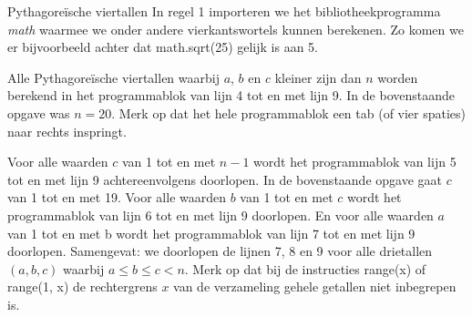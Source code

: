 \begin{lesactiviteit}{Pythagoreïsche viertallen}
    In regel 1 importeren we het bibliotheekprogramma \emph{math} waarmee we onder andere  vierkantswortels kunnen berekenen. Zo komen we er bijvoorbeeld achter dat math.sqrt(25) gelijk is aan 5.
    
    Alle Pythagoreïsche viertallen waarbij $a$, $b$ en $c$ kleiner zijn dan $n$ worden berekend in het programmablok van lijn 4 tot en met lijn 9. In de bovenstaande opgave was $n=20$. Merk op dat het hele programmablok een tab (of vier spaties) naar rechts inspringt.
    
    Voor alle waarden $c$ van 1 tot en met $n-1$ wordt het programmablok van lijn 5 tot en met lijn 9 achtereenvolgens doorlopen. In de bovenstaande opgave gaat $c$ van 1 tot en met 19. Voor alle waarden $b$ van 1 tot en met $c$ wordt het programmablok van lijn 6 tot en met lijn 9 doorlopen. En voor alle waarden $a$ van 1 tot en met b wordt het programmablok van lijn 7 tot en met lijn 9 doorlopen. Samengevat: we doorlopen de lijnen 7, 8 en 9  voor alle drietallen $(a, b, c)$ waarbij $a \leq b \leq c <n$. Merk op dat bij de instructies range(x) of range(1, x) de rechtergrens $x$ van de verzameling gehele getallen niet inbegrepen is.
    

\end{lesactiviteit}
